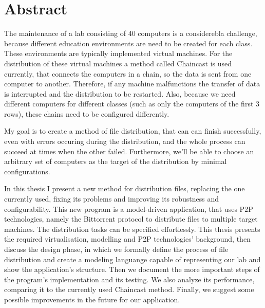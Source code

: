 \chapter*{Abstract}

The maintenance of a lab consisting of 40 computers is a considerebla challenge, because different education environments are need to be created for each class. These environments are typically implemented virtual machines. For the distribution of these virtual machines a method called Chaincast is used currently, that connects the computers in a chain, so the data is sent from one computer to another. Therefore, if any machine malfunctions the transfer of data is interrupted and the distribution to be restarted. Also, because we need different computers for different classes (such as only the computers of the first 3 rows), these chains need to be configured differently.

My goal is to create a method of file distribution, that can can finish successfully, even with errors occuring during the distribution, and the whole process can succeed at times when the other failed. Furthermore, we'll be able to choose an arbitrary set of computers as the target of the distribution by minimal configurations.

In this thesis I present a new method for distribution files, replacing the one currently used, fixing its problems and improving its robustness and configurability. 
This new program is a model-driven application, that uses P2P technologies, namely the Bittorrent protocol to distribute files to multiple target machines. The distribution tasks can be specified effortlessly. This thesis presents the required virtualisation, modelling and P2P technologies' background, then discuss the design phase, in which we formally define the process of file distribution and create a modeling languange capable of representing our lab and show the application's structure. Then we document the more important steps of the program's implementation and its testing. We also analyze its performance, comparing it to the currently used Chaincast method. Finally, we suggest some possible improvements in the future for our application.
\vfill

\selectthesislanguage
{}
\setcounter{romanPage}{\value{page}}
